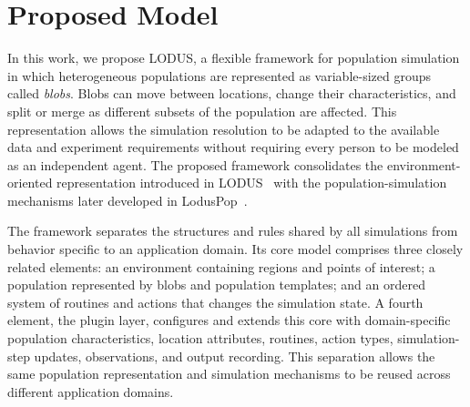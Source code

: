 \chapter{Proposed Model} 
\label{chapter:proposed_model}


In this work, we propose LODUS, a flexible framework for population simulation in which heterogeneous populations are represented as variable-sized groups called \textit{blobs}. Blobs can move between locations, change their characteristics, and split or merge as different subsets of the population are affected. This representation allows the simulation resolution to be adapted to the available data and experiment requirements without requiring every person to be modeled as an independent agent. The proposed framework consolidates the environment-oriented representation introduced in LODUS~\cite{silva2020lodus} with the population-simulation mechanisms later developed in LodusPop~\cite{silva2026lodusPop}. %



The framework separates the structures and rules shared by all simulations from behavior specific to an application domain. Its core model comprises three closely related elements: an environment containing regions and points of interest; a population represented by blobs and population templates; and an ordered system of routines and actions that changes the simulation state. 
A fourth element, the plugin layer, configures and extends this core with domain-specific population characteristics, location attributes, routines, action types, simulation-step updates, observations, and output recording. This separation allows the same population representation and simulation mechanisms to be reused across different application domains.

